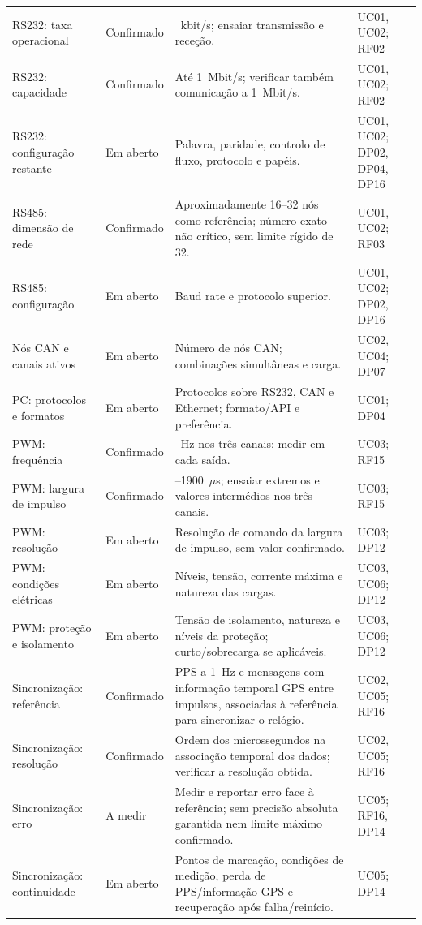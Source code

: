 \begin{longtable}{@{}>{\raggedright\arraybackslash}p{}>{\raggedright\arraybackslash}p{}>{\raggedright\arraybackslash}p{}>{\raggedright\arraybackslash}p{}@{}}
RS232: taxa operacional & Confirmado & 500~kbit/s; ensaiar transmissão e receção. & UC01, UC02; RF02 \\
RS232: capacidade & Confirmado & Até 1~Mbit/s; verificar também comunicação a 1~Mbit/s. & UC01, UC02; RF02 \\
RS232: configuração restante & Em aberto & Palavra, paridade, controlo de fluxo, protocolo e papéis. & UC01, UC02; DP02, DP04, DP16 \\
RS485: dimensão de rede & Confirmado & Aproximadamente 16--32 nós como referência; número exato não crítico, sem limite rígido de 32. & UC01, UC02; RF03 \\
RS485: configuração & Em aberto & Baud rate e protocolo superior. & UC01, UC02; DP02, DP16 \\
Nós CAN e canais ativos & Em aberto & Número de nós CAN; combinações simultâneas e carga. & UC02, UC04; DP07 \\
PC: protocolos e formatos & Em aberto & Protocolos sobre RS232, CAN e Ethernet; formato/API e preferência. & UC01; DP04 \\
PWM: frequência & Confirmado & 50~Hz nos três canais; medir em cada saída. & UC03; RF15 \\
PWM: largura de impulso & Confirmado & 1100--1900~$\mu$s; ensaiar extremos e valores intermédios nos três canais. & UC03; RF15 \\
PWM: resolução & Em aberto & Resolução de comando da largura de impulso, sem valor confirmado. & UC03; DP12 \\
PWM: condições elétricas & Em aberto & Níveis, tensão, corrente máxima e natureza das cargas. & UC03, UC06; DP12 \\
PWM: proteção e isolamento & Em aberto & Tensão de isolamento, natureza e níveis da proteção; curto/sobrecarga se aplicáveis. & UC03, UC06; DP12 \\
Sincronização: referência & Confirmado & PPS a 1~Hz e mensagens com informação temporal GPS entre impulsos, associadas à referência para sincronizar o relógio. & UC02, UC05; RF16 \\
Sincronização: resolução & Confirmado & Ordem dos microssegundos na associação temporal dos dados; verificar a resolução obtida. & UC02, UC05; RF16 \\
Sincronização: erro & A medir & Medir e reportar erro face à referência; sem precisão absoluta garantida nem limite máximo confirmado. & UC05; RF16, DP14 \\
Sincronização: continuidade & Em aberto & Pontos de marcação, condições de medição, perda de PPS/informação GPS e recuperação após falha/reinício. & UC05; DP14 \\

\end{longtable}
